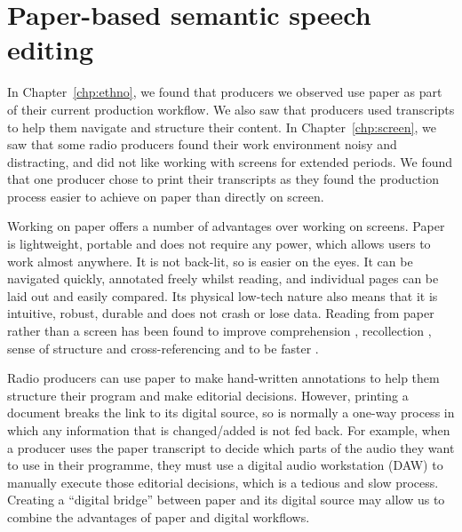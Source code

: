 \chapter{Paper-based semantic speech editing}\label{chp:paper}

In Chapter~\ref{chp:ethno}, we found that producers we observed use paper as part of their current production workflow.
We also saw that producers used transcripts to help them navigate and structure their content.  In
Chapter~\ref{chp:screen}, we saw that some radio producers found their work environment noisy and distracting, and did
not like working with screens for extended periods.  We found that one producer chose to print their transcripts as
they found the production process easier to achieve on paper than directly on screen.


Working on paper offers a number of advantages over working on screens.  Paper is lightweight, portable and does not
require any power, which allows users to work almost anywhere.  It is not back-lit, so is easier on the eyes.  It can
be navigated quickly, annotated freely whilst reading, and individual pages can be laid out and easily compared.  Its
physical low-tech nature also means that it is intuitive, robust, durable and does not crash or lose data.  Reading
from paper rather than a screen has been found to improve comprehension \citep{Mangen2013}, recollection
\citep{Singer2017}, sense of structure and cross-referencing \citep{OHara1997} and to be faster \citep{Kurniawan2001}.

Radio producers can use paper to make hand-written annotations to help them structure their program and make editorial
decisions.  However, printing a document breaks the link to its digital source, so is normally a one-way process in
which any information that is changed/added is not fed back.  For example, when a producer uses the paper transcript to
decide which parts of the audio they want to use in their programme, they must use a digital audio workstation (DAW) to
manually execute those editorial decisions, which is a tedious and slow process.  Creating a ``digital bridge'' between
paper and its digital source may allow us to combine the advantages of paper and digital workflows.

